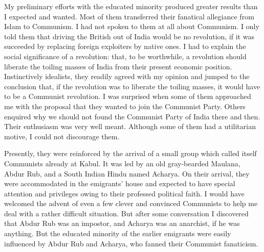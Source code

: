My preliminary efforts with the educated minority produced greater results than I expected and wanted. Most of them transferred their fanatical allegiance from Islam to Communism. I had not spoken to them at all about Communism. I only told them that driving the British out of India would be no revolution, if it was succeeded by replacing foreign exploiters by native ones. I had to explain the social significance of a revolution: that, to be worthwhile, a revolution should liberate the toiling masses of India from their present economic position. Instinctively idealists, they readily agreed with my opinion and jumped to the conclusion that, if the revolution was to liberate the toiling masses, it would have to be a Communist revolution. I was surprised when some of them approached me with the proposal that they wanted to 
join the Communist Party. Others enquired why we should not found the Communist Party of India there and then. Their enthusiasm was very well meant. Although some of them had a utilitarian motive, I could not discourage them. 

Presently, they were reinforced by the arrival of a small group which called itself Communists already at Kabul. It was led by an old gray-bearded Maulana, Abdur Rub, and a South Indian Hindu named Acharya. On their arrival, they were accommodated in the emigrants' house and expected to have special attention and privileges owing to their professed political faith. I would have welcomed the advent 
of even a few clever and convinced Communists to help me deal with a rather difficult situation. But after some conversation I discovered that Abdur Rub was an impostor, and Acharya was an anarchist, if he was anything. But the educated minority of the earlier emigrants were easily 
influenced by Abdur Rub and Acharya, who fanned their Communist fanaticism. 

